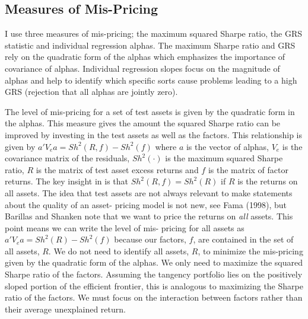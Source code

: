 
\subsection{Measures of Mis-Pricing}

I use three measures of mis-pricing; the maximum squared Sharpe ratio, the GRS statistic
and individual regression alphas. The maximum Sharpe ratio and GRS rely on the quadratic
form of the alphas which emphasizes the importance of covariance of alphas. Individual
regression slopes focus on the magnitude of alphas and help to identify which specific
sorts cause problems leading to a high GRS (rejection that all alphas are jointly zero).

The level of mis-pricing for a set of test assets is given by the quadratic form in the
alphas. This measure gives the amount the squared Sharpe ratio can be improved by
investing in the test assets as well as the factors. This relationship is given by
$a'V_ea=Sh^2\left(R,f\right)-Sh^2\left(f\right)$ where $a$ is the vector of alphas, $V_e$
is the covariance matrix of the residuals, $Sh^2\left(\cdot\right)$ is the maximum squared
Sharpe ratio, $R$ is the matrix of test asset excess returns and $f$ is the matrix of
factor returns. The key insight in \textcite{barillas2016alpha} is that
$Sh^2\left(R,f\right)=Sh^2\left(R\right)$ if $R$ is the returns on all assets. The idea
that test assets are not always relevant to make statements about the quality of an asset-
pricing model is not new, see Fama (1998), but Barillas and Shanken note that we want to
price the returns on \emph{all} assets. This point means we can write the level of mis-
pricing for all assets as $a'V_ea=Sh^2\left(R\right)-Sh^2\left(f\right)$ because our
factors, $f$, are contained in the set of all assets, $R$. We do not need to identify all
assets, $R$, to minimize the mis-pricing given by the quadratic form of the alphas. We
only need to maximize the squared Sharpe ratio of the factors. Assuming the tangency
portfolio lies on the positively sloped portion of the efficient frontier, this is
analogous to maximizing the Sharpe ratio of the factors. We must focus on the interaction
between factors rather than their average unexplained return.

